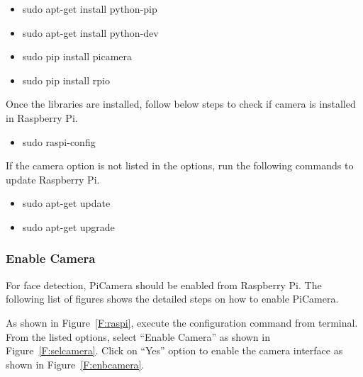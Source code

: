 \begin{itemize}
\item sudo apt-get install python-pip
\item sudo apt-get install python-dev
\item sudo pip install picamera
\item sudo pip install rpio
\end{itemize}

Once the libraries are installed, follow below steps to check if camera 
is installed in Raspberry Pi.
\begin{itemize}
\item sudo raspi-config
\end{itemize}


If the camera option is not listed in the options, run the following commands 
to update Raspberry Pi.
\begin{itemize}
\item sudo apt-get update
\item sudo apt-get upgrade
\end{itemize}

\subsubsection{Enable Camera}
For face detection, PiCamera should be enabled from Raspberry Pi. The 
following list of figures shows the detailed steps on how to enable PiCamera.

As shown in Figure~\ref{F:raspi}, execute the configuration command from 
terminal. From the listed options, select ``Enable Camera'' as shown in 
Figure~\ref{F:selcamera}. Click on ``Yes'' option to enable the camera 
interface as shown in Figure~\ref{F:enbcamera}.

